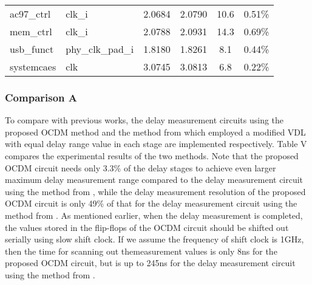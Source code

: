 \begin{table}[]
\begin{center}
\begin{tabular}{@{}llcccc}
            ac97\_ctrl    & clk\_i           & 2.0684                                                                                       & 2.0790                                                                                      & 10.6                                                           & 0.51\%                                                         \\ 
            mem\_ctrl     & clk\_i           & 2.0788                                                                                       & 2.0931                                                                                      & 14.3                                                           & 0.69\%                                                         \\ 
            usb\_funct    & phy\_clk\_pad\_i & 1.8180                                                                                       & 1.8261                                                                                      & 8.1                                                            & 0.44\%                                                         \\ 
            systemcaes    & clk              & 3.0745                                                                                       & 3.0813                                                                                      & 6.8                                                            & 0.22\%                                                     \\ 
            \bottomrule
    \end{tabular}
  \end{center}
\end{table}

\subsubsection{Comparison A}
To compare with previous works, the delay measurement circuits using the proposed OCDM method and the method from \cite{datta2004chip} which employed a modified VDL with equal delay range value in each stage are implemented respectively. Table V compares the experimental results of the two methods. Note that the proposed OCDM circuit needs only 3.3\% of the delay stages to achieve even larger maximum delay measurement range compared to the delay measurement circuit using the method from \cite{datta2004chip}, while the delay measurement resolution of the proposed OCDM circuit is only 49\% of that for the delay measurement circuit using the method from \cite{datta2004chip}. As mentioned earlier, when the delay measurement is completed, the values stored in the flip-flops of the OCDM circuit should be shifted out serially using slow shift clock. If we assume the frequency of shift clock is 1GHz, then the time for scanning out themeasurement values is only 8ns for the proposed OCDM circuit, but is up to 245ns for the delay measurement circuit using the method from \cite{datta2004chip}.


